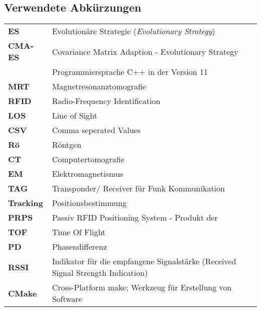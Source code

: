 \newpage
%
\subsection*{Verwendete Abkürzungen}
%
\begin{table} [H]
	\begin{center}
		\begin{tabular}{p{25mm}p{95mm}}
		      	\textbf{ES} & Evolutionäre Strategie (\textit{Evolutionary Strategy})\\
		      	\textbf{CMA-ES}  & Covariance Matrix Adaption - Evolutionary Strategy\\
		      	\textbf{\cpp11} & Programmiersprache C++ in der Version 11\\
		      	\textbf{MRT}	& Magnetresonanztomografie\\
		      	\textbf{RFID} & Radio-Frequency Identification\\
		      	\textbf{LOS} & Line of Sight\\
		      	\textbf{CSV} & Comma seperated Values\\
		      	\textbf{Rö} & Röntgen\\
		      	\textbf{CT} & Computertomografie\\
		      	\textbf{EM} & Elektromagnetismus\\
		      	\textbf{TAG} & Transponder/ Receiver für Funk Kommunikation\\
		      	\textbf{Tracking} & Positionsbestimmung\\
		      	\textbf{PRPS} & Passiv RFID Positioning System - Produkt der \amedogmbh \\
		      	\textbf{TOF} & Time Of Flight\\
		      	\textbf{PD} & Phasendifferenz\\
		      	\textbf{RSSI} & Indikator für die empfangene Signalstärke (Received Signal Strength Indication)\\
		      	\textbf{CMake} & Cross-Platform make; Werkzeug für Erstellung von Software
%		      	
		\end{tabular}
	\end{center}
\end{table}

